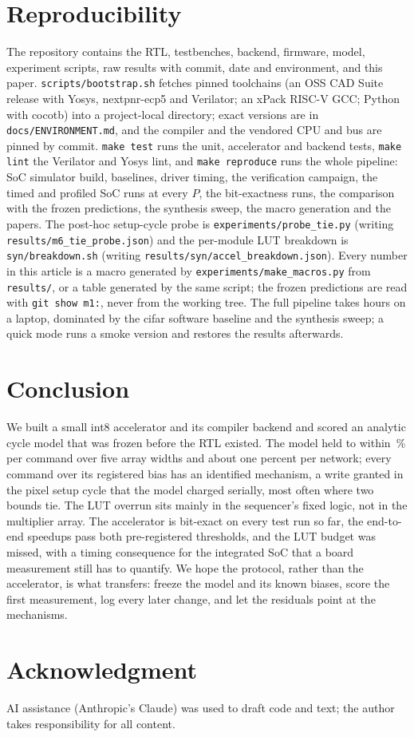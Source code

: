 \documentclass[journal]{IEEEtran}
\begin{document}
\section{Reproducibility}\label{sec:repro}
The repository contains the RTL, testbenches, backend, firmware, model, experiment scripts, raw results with commit, date and environment, and this paper. \texttt{scripts/bootstrap.sh} fetches pinned toolchains (an OSS CAD Suite release with Yosys, nextpnr-ecp5 and Verilator; an xPack RISC-V GCC; Python with cocotb) into a project-local directory; exact versions are in \texttt{docs/ENVIRONMENT.md}, and the compiler and the vendored CPU and bus are pinned by commit. \texttt{make test} runs the unit, accelerator and backend tests, \texttt{make lint} the Verilator and Yosys lint, and \texttt{make reproduce} runs the whole pipeline: SoC simulator build, baselines, driver timing, the verification campaign, the timed and profiled SoC runs at every $P$, the bit-exactness runs, the comparison with the frozen predictions, the synthesis sweep, the macro generation and the papers. The post-hoc setup-cycle probe is \texttt{experiments/probe\_tie.py} (writing \texttt{results/m6\_tie\_probe.json}) and the per-module LUT breakdown is \texttt{syn/breakdown.sh} (writing \texttt{results/syn/accel\_breakdown.json}). Every number in this article is a macro generated by \texttt{experiments/make\_macros.py} from \texttt{results/}, or a table generated by the same script; the frozen predictions are read with \texttt{git show m1:}, never from the working tree. The full pipeline takes hours on a laptop, dominated by the cifar software baseline and the synthesis sweep; a quick mode runs a smoke version and restores the results afterwards.

\section{Conclusion}\label{sec:conclusion}
We built a small int8 accelerator and its compiler backend and scored an analytic cycle model that was frozen before the RTL existed. The model held to within \MeasCfourMaxErr\,\% per command over five array widths and about one percent per network; every command over its registered bias has an identified mechanism, a write granted in the pixel setup cycle that the model charged serially, most often where two bounds tie. The LUT overrun sits mainly in the sequencer's fixed logic, not in the multiplier array. The accelerator is bit-exact on every test run so far, the end-to-end speedups pass both pre-registered thresholds, and the LUT budget was missed, with a timing consequence for the integrated SoC that a board measurement still has to quantify. We hope the protocol, rather than the accelerator, is what transfers: freeze the model and its known biases, score the first measurement, log every later change, and let the residuals point at the mechanisms.

\section*{Acknowledgment}
AI assistance (Anthropic's Claude) was used to draft code and text; the author takes responsibility for all content.



\end{document}
